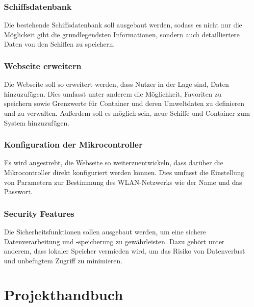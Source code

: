 \documentclass[
    headings=optiontotocandhead,%
    twoside,
    numbers=noenddot,%
    12pt, %
    titlepage, %
    parskip=full, %
    listof=leveldown, 
    numbers=noenddot, %
    a4paper,DIV=14,
    BCOR=15mm,
]{scrbook}
\makeatletter
\newcommand*{\the@orig@section}{}
\let\the@orig@section\section
\renewcommand*{\section}{%
  \clearpage
  \the@orig@section
}
\makeatother
\begin{document}
\hypertarget{schiffsdatenbank}{%
\subsubsection{Schiffsdatenbank}\label{schiffsdatenbank}}

Die bestehende Schiffsdatenbank soll ausgebaut werden, sodass es nicht
nur die Möglickeit gibt die grundlegendsten Informationen, sondern auch
detailliertere Daten von den Schiffen zu speichern.

\hypertarget{webseite-erweitern}{%
\subsubsection{Webseite erweitern}\label{webseite-erweitern}}

Die Webseite soll so erweitert werden, dass Nutzer in der Lage sind,
Daten hinzuzufügen. Dies umfasst unter anderem die Möglichkeit,
Favoriten zu speichern sowie Grenzwerte für Container und deren
Umweltdaten zu definieren und zu verwalten. Außerdem soll es möglich
sein, neue Schiffe und Container zum System hinzuzufügen.

\hypertarget{konfiguration-der-mikrocontroller}{%
\subsubsection{Konfiguration der
Mikrocontroller}\label{konfiguration-der-mikrocontroller}}

Es wird angestrebt, die Webseite so weiterzuentwickeln, dass darüber die
Mikrocontroller direkt konfiguriert werden können. Dies umfasst die
Einstellung von Parametern zur Bestimmung des WLAN-Netzwerks wie der
Name und das Passwort.

\hypertarget{security-features}{%
\subsubsection{Security Features}\label{security-features}}

Die Sicherheitsfunktionen sollen ausgebaut werden, um eine sichere
Datenverarbeitung und -speicherung zu gewährleisten. Dazu gehört unter
anderem, dass lokaler Speicher vermieden wird, um das Risiko von
Datenverlust und unbefugtem Zugriff zu minimieren.

\hypertarget{projekthandbuch}{%
\section{Projekthandbuch}\label{projekthandbuch}}
\end{document}
